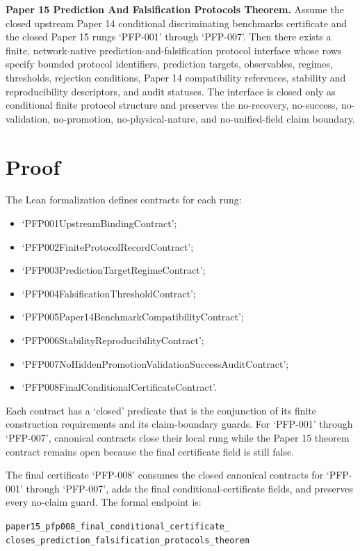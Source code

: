\documentclass{article}
\begin{document}
\textbf{Paper 15 Prediction And Falsification Protocols Theorem.}
Assume the closed upstream Paper 14 conditional discriminating benchmarks
certificate and the closed Paper 15 rungs `PFP-001' through `PFP-007'. Then
there exists a finite, network-native prediction-and-falsification protocol
interface whose rows specify bounded protocol identifiers, prediction targets,
observables, regimes, thresholds, rejection conditions, Paper 14 compatibility
references, stability and reproducibility descriptors, and audit statuses.
The interface is closed only as conditional finite protocol structure and
preserves the no-recovery, no-success, no-validation, no-promotion,
no-physical-nature, and no-unified-field claim boundary.

\section{Proof}

The Lean formalization defines contracts for each rung:

\begin{itemize}[leftmargin=*]
\item `PFP001UpstreamBindingContract';
\item `PFP002FiniteProtocolRecordContract';
\item `PFP003PredictionTargetRegimeContract';
\item `PFP004FalsificationThresholdContract';
\item `PFP005Paper14BenchmarkCompatibilityContract';
\item `PFP006StabilityReproducibilityContract';
\item `PFP007NoHiddenPromotionValidationSuccessAuditContract';
\item `PFP008FinalConditionalCertificateContract'.
\end{itemize}

Each contract has a `closed' predicate that is the conjunction of its finite
construction requirements and its claim-boundary guards. For `PFP-001'
through `PFP-007', canonical contracts close their local rung while the Paper
15 theorem contract remains open because the final certificate field is still
false.

The final certificate `PFP-008' consumes the closed canonical contracts for
`PFP-001' through `PFP-007', adds the final conditional-certificate fields,
and preserves every no-claim guard. The formal endpoint is:

\begin{flushleft}
\footnotesize
\texttt{paper15\_pfp008\_final\_conditional\_certificate\_}\\
\texttt{closes\_prediction\_falsification\_protocols\_theorem}
\end{flushleft}
\end{document}
